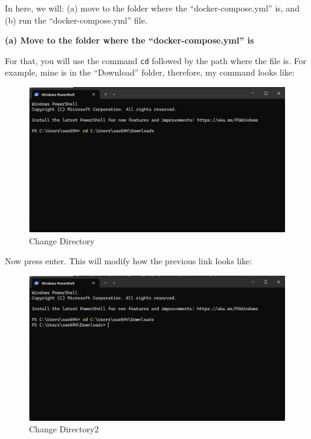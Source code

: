 \documentclass[
  letterpaper,
  DIV=11,
  numbers=noendperiod]{scrreprt}
\begin{document}
In here, we will: (a) move to the folder where the
``docker-compose.yml'' is, and (b) run the ``docker-compose.yml'' file.

\textbf{(a) Move to the folder where the ``docker-compose.yml'' is}

For that, you will use the command \texttt{cd} followed by the path
where the file is. For example, mine is in the ``Download'' folder,
therefore, my command looks like:

\begin{figure}[H]

{\centering \includegraphics[width=6.25in,height=\textheight]{media/amcat-2.1.2_12.png}

}

\caption{Change Directory}

\end{figure}%

Now press enter. This will modify how the previous link looks like:

\begin{figure}[H]

{\centering \includegraphics[width=6.25in,height=\textheight]{media/amcat-2.1.2_13.png}

}

\caption{Change Directory2}

\end{figure}%
\end{document}
